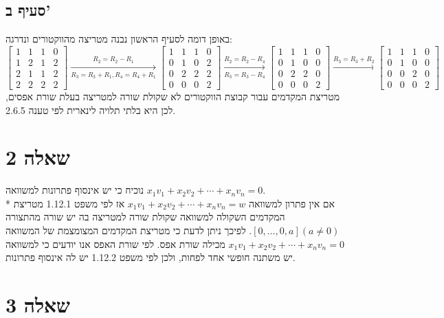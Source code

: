 \documentclass[a4paper, 10pt]{article}
\begin{document}
\begin{hebrew}
	 \subsection{סעיף ב'}
	 באופן דומה לסעיף הראשון נבנה מטריצה מהווקטורים ונדרגה:
	 \[
		\begin{bmatrix}
			1 & 1 & 1 & 0 \\
			1 & 2 & 1 & 2 \\
			2 & 1 & 1 & 2 \\
			2 & 2 & 2 & 2
		\end{bmatrix}
		\xrightarrow[R_3 = R_3 + R_1, R_4 = R_4 + R_1]{R_2 = R_2 - R_1}
		\begin{bmatrix}
			1 & 1 & 1 & 0 \\
			0 & 1 & 0 & 2 \\
			0 & 2 & 2 & 2 \\
			0 & 0 & 0 & 2
		\end{bmatrix}
		\xrightarrow[R_3 = R_3 - R_4]{R_2 = R_2 - R_4}
		\begin{bmatrix}
			1 & 1 & 1 & 0 \\
			0 & 1 & 0 & 0 \\
			0 & 2 & 2 & 0 \\
			0 & 0 & 0 & 2
		\end{bmatrix}
		\xrightarrow{R_3 = R_3 + R_2}
		\begin{bmatrix}
			1 & 1 & 1 & 0 \\
			0 & 1 & 0 & 0 \\
			0 & 0 & 2 & 0 \\
			0 & 0 & 0 & 2
		\end{bmatrix}
	\]
	מטריצת המקדמים עבור קבוצת הווקטורים לא שקולת שורה למטריצה בעלת שורת אפסים, לכן היא בלתי תלויה לינארית לפי טענה 2.6.5.

	\section{שאלה 2}
	נוכיח כי יש אינסוף פתרונות למשוואה
	$x_1v_1 + x_2v_2 + \cdots + x_n v_n = 0$. \\*
	אם אין פתרון למשוואה $x_1v_1 + x_2v_2 + \cdots + x_n v_n = w$
	אז לפי משפט 1.12.1 מטריצת המקדמים השקולה למשוואה שקולת שורה
	למטריצה בה יש שורה מהתצורה $[0, \ldots, 0, a] (a \ne 0)$.
	לפיכך ניתן לדעת כי מטריצת המקדמים המצומצמת של המשוואה
	$x_1v_1 + x_2v_2 + \cdots + x_n v_n = 0$
	מכילה שורת אפס.
	לפי שורת האפס אנו יודעים כי למשוואה יש משתנה חופשי אחד לפחות,
	ולכן לפי משפט 1.12.2 יש לה אינסוף פתרונות.

	\section{שאלה 3}

\end{hebrew}
\end{document}

